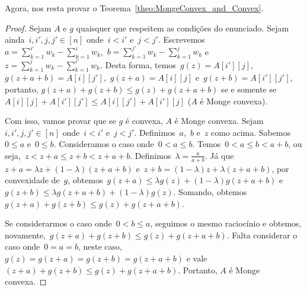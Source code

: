 Agora, nos resta provar o Teorema~\ref{theo:MongeConvex_and_Convex}.

\begin{proof}
Sejam $A$ e $g$ quaisquer que respeitem as condições do enunciado. Sejam ainda~$i,i',j,j' \in [n]$ onde~$i < i'$ e~$j < j'$. Escrevemos~$a = \sum \limits_{k=1}^{i'} w_k - \sum \limits_{k=1}^{i} w_k$,~$b = \sum \limits_{k=1}^{j'} w_k - \sum \limits_{k=1}^{j} w_k$ e~$z = \sum \limits_{k=1}^{j} w_k - \sum \limits_{k=1}^{i'} w_k$. Desta forma, temos~$g(z) = A[i'][j]$,~$g(z+a+b) = A[i][j']$,~$g(z+a) = A[i][j]$ e~$g(z+b) = A[i'][j']$, portanto, $g(z+a) + g(z+b) \leq g(z) + g(z+a+b)$ se e somente se $A[i][j] + A[i'][j'] \leq A[i][j'] + A[i'][j]$ ($A$ é Monge convexa).

Com isso, vamos provar que se $g$ é convexa, $A$ é Monge convexa. Sejam~$i,i',j,j' \in [n]$ onde~$i < i'$ e~$j < j'$. Definimos~$a$,~$b$ e~$z$ como acima. Sabemos~$0 \leq a$ e~$0 \leq b$. Consideramos o caso onde~$0 < a \leq b$. Temos~$0 < a \leq b < a+b$, ou seja,~$z < z+a \leq z+b < z+a+b$. Definimos~$\lambda = \frac{a}{a+b}$. Já que~$z+a = \lambda z + (1-\lambda)(z+a+b)$ e~$z+b = (1-\lambda)z + \lambda(z+a+b)$, por convexidade de~$g$, obtemos~$g(z+a) \leq \lambda g(z) + (1 - \lambda) g(z+a+b)$ e~$g(z+b) \leq \lambda g(z+a+b) + (1 - \lambda) g(z)$. Somando, obtemos~$g(z+a) + g(z+b) \leq g(z) + g(z+a+b)$.  

Se considerarmos o caso onde~$0 < b \leq a$, seguimos o mesmo raciocínio e obtemos, novamente,~$g(z+a) + g(z+b) \leq g(z) + g(z+a+b)$. Falta considerar o caso onde~$0 = a = b$, neste caso,~$g(z) = g(z+a) = g(z+b) = g(z+a+b)$ e vale~$(z+a) + g(z+b) \leq g(z) + g(z+a+b)$. Portanto, $A$ é Monge convexa.
\end{proof}
